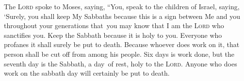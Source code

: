 
\begin{inparaenum}
    
     The \textsc{Lord} spoke to Moses, saying,%
     ``You, speak to the children of Israel, saying, `Surely, you shall keep My Sabbaths because this is a sign between Me and you throughout your generations that\understood\ you may know that I am the \textsc{Lord} who sanctifies you.%
     Keep the Sabbath because it is holy to you. Everyone who profanes it shall surely be put to death. Because whoever does work on it, that person shall be cut off from among his people.%
     Six days is work done, but the seventh day is the Sabbath, a day\understood\ of rest, holy to the \textsc{Lord}. Anyone who does work on the sabbath day will certainly be put to death.%
    
\end{inparaenum}
